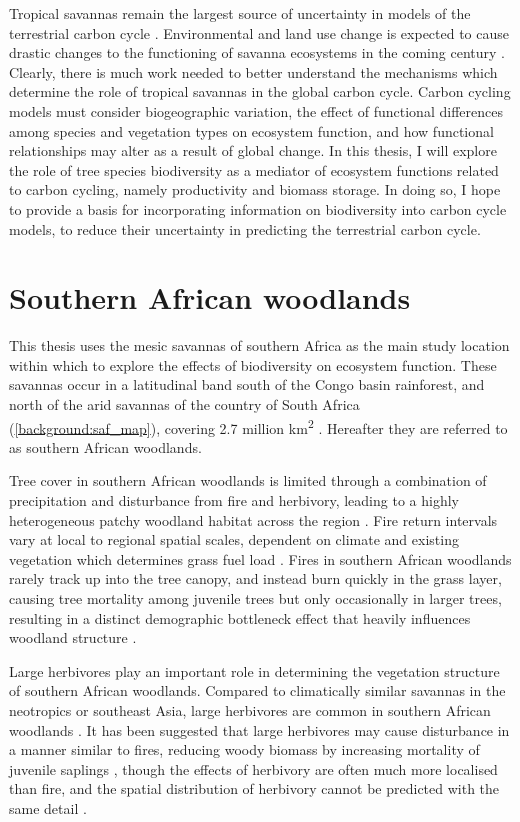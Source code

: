 \begin{refsection}
Tropical savannas remain the largest source of uncertainty in models of the terrestrial carbon cycle \citep{Ahlstrom2015}. Environmental and land use change is expected to cause drastic changes to the functioning of savanna ecosystems in the coming century \citep{Ross2021}. Clearly, there is much work needed to better understand the mechanisms which determine the role of tropical savannas in the global carbon cycle. Carbon cycling models must consider biogeographic variation, the effect of functional differences among species and vegetation types on ecosystem function, and how functional relationships may alter as a result of global change. In this thesis, I will explore the role of tree species biodiversity as a mediator of ecosystem functions related to carbon cycling, namely productivity and biomass storage. In doing so, I hope to provide a basis for incorporating information on biodiversity into carbon cycle models, to reduce their uncertainty in predicting the terrestrial carbon cycle.

\section{Southern African woodlands}
\label{background:sec:southern_african}

This thesis uses the mesic savannas of southern Africa as the main study location within which to explore the effects of biodiversity on ecosystem function. These savannas occur in a latitudinal band south of the Congo basin rainforest, and north of the arid savannas of the country of South Africa (\autoref{background:saf_map}), covering \textapprox{}2.7 million km\textsuperscript{2} \citep{Arino2010}. Hereafter they are referred to as southern African woodlands.

Tree cover in southern African woodlands is limited through a combination of precipitation and disturbance from fire and herbivory, leading to a highly heterogeneous patchy woodland habitat across the region \citep{Archibald2019}. Fire return intervals vary at local to regional spatial scales, dependent on climate and existing vegetation which determines grass fuel load \citep{Archibald2010}. Fires in southern African woodlands rarely track up into the tree canopy, and instead burn quickly in the grass layer, causing tree mortality among juvenile trees but only occasionally in larger trees, resulting in a distinct demographic bottleneck effect that heavily influences woodland structure \citep{Frost1996}. 

Large herbivores play an important role in determining the vegetation structure of southern African woodlands. Compared to climatically similar savannas in the neotropics or southeast Asia, large herbivores are common in southern African woodlands \citep{Asner2009}. It has been suggested that large herbivores may cause disturbance in a manner similar to fires, reducing woody biomass by increasing mortality of juvenile saplings \citep{Bond2005}, though the effects of herbivory are often much more localised than fire, and the spatial distribution of herbivory cannot be predicted with the same detail \citep{Hempson2015}. 


\end{refsection}
